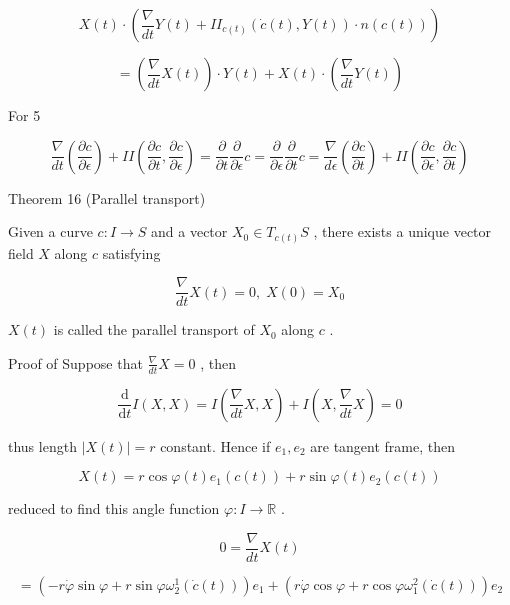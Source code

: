 \documentclass[lang=cn,a4paper,11pt,openany,twoside]{elegantbook}
\begin{document}
\[
X\left( t\right)  \cdot  \left( {\frac{\nabla }{dt}Y\left( t\right)  + I{I}_{c\left( t\right) }\left( {\dot{c}\left( t\right) ,Y\left( t\right) }\right)  \cdot  n\left( {c\left( t\right) }\right) }\right)
\]

\[
= \left( {\frac{\nabla }{dt}X\left( t\right) }\right)  \cdot  Y\left( t\right)  + X\left( t\right)  \cdot  \left( {\frac{\nabla }{dt}Y\left( t\right) }\right)
\]

For 5

\[
\frac{\nabla }{dt}\left( \frac{\partial c}{\partial \epsilon }\right)  + {II}\left( {\frac{\partial c}{\partial t},\frac{\partial c}{\partial \epsilon }}\right)  = \frac{\partial }{\partial t}\frac{\partial }{\partial \epsilon }c = \frac{\partial }{\partial \epsilon }\frac{\partial }{\partial t}c = \frac{\nabla }{d\epsilon }\left( \frac{\partial c}{\partial t}\right)  + {II}\left( {\frac{\partial c}{\partial \epsilon },\frac{\partial c}{\partial t}}\right)
\]

Theorem 16 (Parallel transport)

Given a curve \(c : I \rightarrow  S\) and a vector \({X}_{0} \in  {T}_{c\left( t\right) }S\) , there exists a unique vector field \(X\) along \(c\) satisfying

\[
\frac{\nabla }{dt}X\left( t\right)  = 0,\;X\left( 0\right)  = {X}_{0}
\]

\(X\left( t\right)\) is called the parallel transport of \({X}_{0}\) along \(c\) .

Proof of Suppose that \(\frac{\nabla }{dt}X = 0\) , then

\[
\frac{\mathrm{d}}{\mathrm{d}t}I\left( {X,X}\right)  = I\left( {\frac{\nabla }{dt}X,X}\right)  + I\left( {X,\frac{\nabla }{dt}X}\right)  = 0
\]

thus length \(\left| {X\left( t\right) }\right|  = r\) constant. Hence if \({e}_{1},{e}_{2}\) are tangent frame, then

\[
X\left( t\right)  = r\cos \varphi \left( t\right) {e}_{1}\left( {c\left( t\right) }\right)  + r\sin \varphi \left( t\right) {e}_{2}\left( {c\left( t\right) }\right)
\]

reduced to find this angle function \(\varphi  : I \rightarrow  \mathbb{R}\) .

\[
0 = \frac{\nabla }{dt}X\left( t\right)
\]

\[
= \left( {-r\dot{\varphi }\sin \varphi  + r\sin \varphi {\omega }_{2}^{1}\left( {\dot{c}\left( t\right) }\right) }\right) {e}_{1} + \left( {r\dot{\varphi }\cos \varphi  + r\cos \varphi {\omega }_{1}^{2}\left( {\dot{c}\left( t\right) }\right) }\right) {e}_{2}
\]
\end{document}
